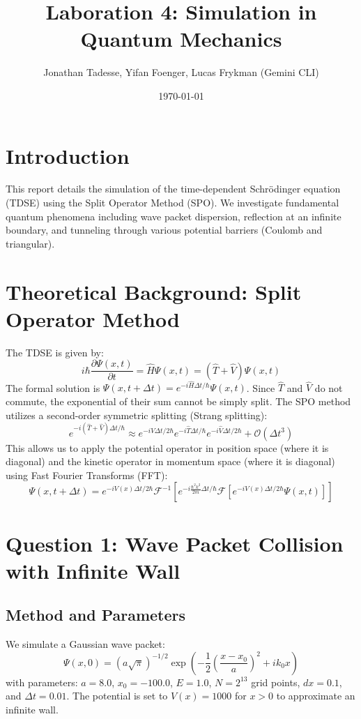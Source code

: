 \documentclass{article}
\title{Laboration 4: Simulation in Quantum Mechanics}
\author{Jonathan Tadesse, Yifan Foenger, Lucas Frykman (Gemini CLI)}
\date{\today}
\begin{document}
\maketitle

\section{Introduction}
This report details the simulation of the time-dependent Schrödinger equation (TDSE) using the Split Operator Method (SPO). We investigate fundamental quantum phenomena including wave packet dispersion, reflection at an infinite boundary, and tunneling through various potential barriers (Coulomb and triangular).

\section{Theoretical Background: Split Operator Method}
The TDSE is given by:
\begin{equation}
i\hbar \frac{\partial \Psi(x,t)}{\partial t} = \hat{H} \Psi(x,t) = (\hat{T} + \hat{V}) \Psi(x,t)
\end{equation}
The formal solution is $\Psi(x, t+\Delta t) = e^{-i\hat{H}\Delta t/\hbar} \Psi(x,t)$. Since $\hat{T}$ and $\hat{V}$ do not commute, the exponential of their sum cannot be simply split. The SPO method utilizes a second-order symmetric splitting (Strang splitting):
\begin{equation}
e^{-i(\hat{T}+\hat{V})\Delta t/\hbar} \approx e^{-i\hat{V}\Delta t/2\hbar} e^{-i\hat{T}\Delta t/\hbar} e^{-i\hat{V}\Delta t/2\hbar} + \mathcal{O}(\Delta t^3)
\end{equation}
This allows us to apply the potential operator in position space (where it is diagonal) and the kinetic operator in momentum space (where it is diagonal) using Fast Fourier Transforms (FFT):
\begin{equation}
\Psi(x, t+\Delta t) = e^{-iV(x)\Delta t/2\hbar} \mathcal{F}^{-1} \left[ e^{-i\frac{\hbar^2 k^2}{2m}\Delta t/\hbar} \mathcal{F} \left[ e^{-iV(x)\Delta t/2\hbar} \Psi(x,t) \right] \right]
\end{equation}

\section{Question 1: Wave Packet Collision with Infinite Wall}
\subsection{Method and Parameters}
We simulate a Gaussian wave packet:
\begin{equation}
\Psi(x,0) = (a\sqrt{\pi})^{-1/2} \exp\left( -\frac{1}{2} \left(\frac{x-x_0}{a}\right)^2 + ik_0 x \right)
\end{equation}
with parameters: $a=8.0$, $x_0=-100.0$, $E=1.0$, $N=2^{13}$ grid points, $dx=0.1$, and $\Delta t=0.01$. The potential is set to $V(x)=1000$ for $x>0$ to approximate an infinite wall.
\end{document}
